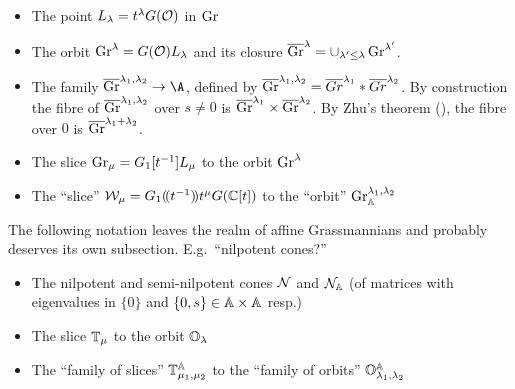 \documentclass{article}
\begin{document}
% 
\begin{itemize}
    \item The point $L_\lambda = t^\lambda G(\cO)$ in $\Gr$ 
    \item The orbit $\Gr^\lambda = G(\cO) L_\lambda$ and its closure $ \overline{\Gr}^\lambda = \cup_{\lambda' \le \lambda} \Gr^{\lambda'}$.
    \item The family $ \overline{\Gr}^{\lambda_1, \lambda_2} \rightarrow \A$, defined by $ \overline{\Gr}^{\lambda_1, \lambda_2} = \overline{Gr}^{\lambda_1} * \overline{Gr}^{\lambda_2}$.  By construction the fibre of $ \overline{\Gr}^{\lambda_1, \lambda_2} $ over $ s \ne 0 $ is $ \overline{\Gr}^{\lambda_1} \times \overline{\Gr}^{\lambda_2}$.  By Zhu's theorem (), the fibre over $ 0 $ is $ \overline{\Gr}^{\lambda_1 + \lambda_2}$.
\end{itemize}
\begin{itemize}
    \item The slice $\Gr_\mu = G_1[t^{-1}]L_\mu$ to the orbit $\Gr^\lambda$
    \item The ``slice'' $\cW_\mu = G_1\xT[t^{-1}] t^\mu G(\CC[t])$ to the ``orbit'' $\Gr_\AA^{\lambda_1,\lambda_2}$ %
\end{itemize}
The following notation leaves the realm of affine Grassmannians and probably deserves its own subsection. E.g.\ ``nilpotent cones?''
\begin{itemize}
    \item The nilpotent and semi-nilpotent cones $\cN$ and $\cN_\AA$ (of matrices with eigenvalues in $\{0\}$ and $\{0,s\} \in \AA\times\AA$ resp.) 
    \item The slice $\TT_\mu$ to the orbit $\OO_\lambda$ 
    \item The ``family of slices'' $\TT_{\mu_1,\mu_2}^{\AA}$ to the ``family of orbits'' $\OO^{\AA}_{\lambda_1,\lambda_2}$ 
\end{itemize}
\end{document}
